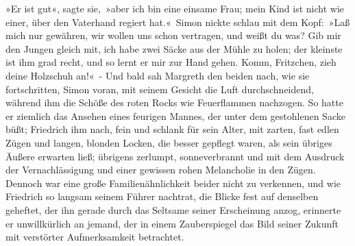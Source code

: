 »Er ist gut«, sagte sie, »aber ich bin eine einsame Frau; mein Kind ist nicht wie einer, über den Vaterhand regiert hat.« Simon nickte schlau mit dem Kopf: »Laß mich nur gewähren, wir wollen uns schon vertragen, und weißt du was? Gib mir den Jungen gleich mit, ich habe zwei Säcke aus der Mühle zu holen; der kleinste ist ihm grad recht, und so lernt er mir zur Hand gehen. Komm, Fritzchen, zieh deine Holzschuh an!« - Und bald sah Margreth den beiden nach, wie sie fortschritten, Simon voran, mit seinem Gesicht die Luft durchschneidend, während ihm die Schöße des roten Rocks wie Feuerflammen nachzogen. So hatte er ziemlich das Ansehen eines feurigen Mannes, der unter dem gestohlenen Sacke büßt; Friedrich ihm nach, fein und schlank für sein Alter, mit zarten, fast edlen Zügen und langen, blonden Locken, die besser gepflegt waren, als sein übriges Äußere erwarten ließ; übrigens zerlumpt, sonneverbrannt und mit dem Ausdruck der Vernachlässigung und einer gewissen rohen Melancholie in den Zügen. Dennoch war eine große Familienähnlichkeit beider nicht zu verkennen, und wie Friedrich so langsam seinem Führer nachtrat, die Blicke fest auf denselben geheftet, der ihn gerade durch das Seltsame seiner Erscheinung anzog, erinnerte er unwillkürlich an jemand, der in einem Zauberspiegel das Bild seiner Zukunft mit verstörter Aufmerksamkeit betrachtet.

